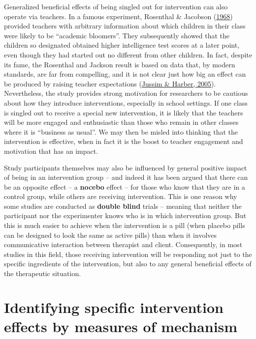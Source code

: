\documentclass{krantz}
\begin{document}
Generalized beneficial effects of being singled out for intervention can also operate via teachers. In a famous experiment, Rosenthal \& Jacobson (\protect\hyperlink{ref-rosenthal1968}{1968})  provided teachers with arbitrary information about which children in their class were likely to be ``academic bloomers''. They subsequently showed that the children so designated obtained higher intelligence test scores at a later point, even though they had started out no different from other children. In fact, despite its fame, the Rosenthal and Jackson result is based on data that, by modern standards, are far from compelling, and it is not clear just how big an effect can be produced by raising teacher expectations (\protect\hyperlink{ref-jussim2005}{Jussim \& Harber, 2005}). Nevertheless, the study provides strong motivation for researchers to be cautious about how they introduce interventions, especially in school settings. If one class is singled out to receive a special new intervention, it is likely that the teachers will be more engaged and enthusiastic than those who remain in other classes where it is ``business as usual''. We may then be misled into thinking that the intervention is effective, when in fact it is the boost to teacher engagement and motivation that has an impact.

Study participants themselves may also be influenced by general positive impact of being in an intervention group -- and indeed it has been argued that there can be an opposite effect -- a \textbf{nocebo} effect -- for those who know that they are in a control group, while others are receiving intervention. This is one reason why some studies are conducted as \textbf{double blind} trials -- meaning that neither the participant nor the experimenter knows who is in which intervention group. But this is much easier to achieve when the intervention is a pill (when placebo pills can be designed to look the same as active pills) than when it involves communicative interaction between therapist and client. Consequently, in most studies in this field, those receiving intervention will be responding not just to the specific ingredients of the intervention, but also to any general beneficial effects of the therapeutic situation.

\hypertarget{identifying-specific-intervention-effects-by-measures-of-mechanism}{%
\section{Identifying specific intervention effects by measures of mechanism}\label{identifying-specific-intervention-effects-by-measures-of-mechanism}}
\end{document}
